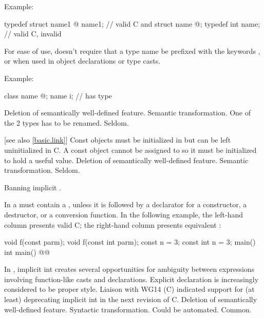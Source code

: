 Example:
\begin{codeblock}
typedef struct name1 { @\commentellip@ } name1;         // valid C and \Cpp{}
struct name { @\commentellip@ };
typedef int name;               // valid C, invalid \Cpp{}
\end{codeblock}

\rationale
For ease of use, \Cpp{} doesn't require that a type name be prefixed
with the keywords ,  or  when used in object
declarations or type casts.

Example:
\begin{codeblock}
class name { @\commentellip@ };
name i;                         //  has type 
\end{codeblock}

\effect
Deletion of semantically well-defined feature.
\difficulty
Semantic transformation.
One of the 2 types has to be renamed.
\howwide
Seldom.

 [see also \ref{basic.link}]
\change
Const objects must be initialized in \Cpp{} but can be left uninitialized in C.
\rationale
A const object cannot be assigned to so it must be initialized
to hold a useful value.
\effect
Deletion of semantically well-defined feature.
\difficulty
Semantic transformation.
\howwide
Seldom.

\change
Banning implicit .

In \Cpp{} a
must contain a
, unless
it is followed by a declarator for a constructor, a destructor, or a
conversion function.
In the following example, the
left-hand column presents valid C;
the right-hand column presents
equivalent \Cpp{}:

\begin{codeblock}
void f(const parm);            void f(const int parm);
const n = 3;                   const int n = 3;
main()                         int main()
    @\commentellip@                      @\commentellip@
\end{codeblock}

\rationale
In \Cpp{}, implicit int creates several opportunities for
ambiguity between expressions involving function-like
casts and declarations.
Explicit declaration is increasingly considered
to be proper style.
Liaison with WG14 (C) indicated support for (at least)
deprecating implicit int in the next revision of C.
\effect
Deletion of semantically well-defined feature.
\difficulty
Syntactic transformation.
Could be automated.
\howwide
Common.

